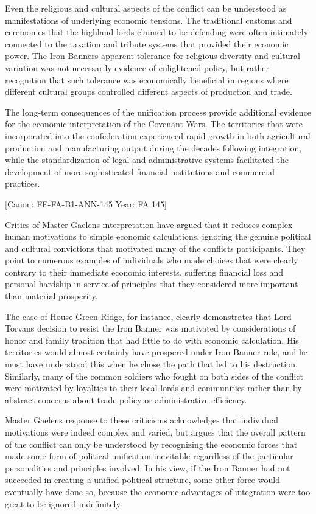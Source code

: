 Even the religious and cultural aspects of the conflict can be
understood as manifestations of underlying economic tensions. The
traditional customs and ceremonies that the highland lords claimed to be
defending were often intimately connected to the taxation and tribute
systems that provided their economic power. The Iron
Banner\textquotesingle s apparent tolerance for religious diversity and
cultural variation was not necessarily evidence of enlightened policy,
but rather recognition that such tolerance was economically beneficial
in regions where different cultural groups controlled different aspects
of production and trade.

The long-term consequences of the unification process provide additional
evidence for the economic interpretation of the Covenant Wars. The
territories that were incorporated into the confederation experienced
rapid growth in both agricultural production and manufacturing output
during the decades following integration, while the standardization of
legal and administrative systems facilitated the development of more
sophisticated financial institutions and commercial practices.

{[}Canon: FE-FA-B1-ANN-145 \textbar{} Year: FA 145{]}

Critics of Master Gaelen\textquotesingle s interpretation have argued
that it reduces complex human motivations to simple economic
calculations, ignoring the genuine political and cultural convictions
that motivated many of the conflict\textquotesingle s participants. They
point to numerous examples of individuals who made choices that were
clearly contrary to their immediate economic interests, suffering
financial loss and personal hardship in service of principles that they
considered more important than material prosperity.

The case of House Green-Ridge, for instance, clearly demonstrates that
Lord Torvan\textquotesingle s decision to resist the Iron Banner was
motivated by considerations of honor and family tradition that had
little to do with economic calculation. His territories would almost
certainly have prospered under Iron Banner rule, and he must have
understood this when he chose the path that led to his destruction.
Similarly, many of the common soldiers who fought on both sides of the
conflict were motivated by loyalties to their local lords and
communities rather than by abstract concerns about trade policy or
administrative efficiency.

Master Gaelen\textquotesingle s response to these criticisms
acknowledges that individual motivations were indeed complex and varied,
but argues that the overall pattern of the conflict can only be
understood by recognizing the economic forces that made some form of
political unification inevitable regardless of the particular
personalities and principles involved. In his view, if the Iron Banner
had not succeeded in creating a unified political structure, some other
force would eventually have done so, because the economic advantages of
integration were too great to be ignored indefinitely.

